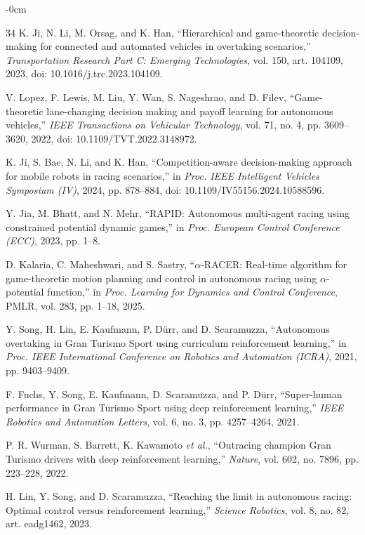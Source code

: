 \documentclass[sensors,article,submit,moreauthors]{Definitions/mdpi}
\begin{document}
\begin{adjustwidth}{-\extralength}{0cm}
\begin{thebibliography}{34}
K. Ji, N. Li, M. Orsag, and K. Han,
``Hierarchical and game-theoretic decision-making for connected and automated
vehicles in overtaking scenarios,'' \emph{Transportation Research Part C:
Emerging Technologies}, vol. 150, art. 104109, 2023,
doi: 10.1016/j.trc.2023.104109.

V. Lopez, F. Lewis, M. Liu, Y. Wan, S. Nageshrao, and D. Filev,
``Game-theoretic lane-changing decision making and payoff learning for
autonomous vehicles,'' \emph{IEEE Transactions on Vehicular Technology},
vol. 71, no. 4, pp. 3609--3620, 2022,
doi: 10.1109/TVT.2022.3148972.

K. Ji, S. Bae, N. Li, and K. Han,
``Competition-aware decision-making approach for mobile robots in racing
scenarios,'' in \emph{Proc. IEEE Intelligent Vehicles Symposium (IV)}, 2024,
pp. 878--884, doi: 10.1109/IV55156.2024.10588596.

Y. Jia, M. Bhatt, and N. Mehr,
``RAPID: Autonomous multi-agent racing using constrained potential dynamic
games,'' in \emph{Proc. European Control Conference (ECC)}, 2023, pp. 1--8.

D. Kalaria, C. Maheshwari, and S. Sastry,
``$\alpha$-RACER: Real-time algorithm for game-theoretic motion planning and
control in autonomous racing using $\alpha$-potential function,'' in
\emph{Proc. Learning for Dynamics and Control Conference}, PMLR, vol. 283,
pp. 1--18, 2025.

Y. Song, H. Lin, E. Kaufmann, P. D\"urr, and D. Scaramuzza,
``Autonomous overtaking in Gran Turismo Sport using curriculum reinforcement
learning,'' in \emph{Proc. IEEE International Conference on Robotics and
Automation (ICRA)}, 2021, pp. 9403--9409.

F. Fuchs, Y. Song, E. Kaufmann, D. Scaramuzza, and P. D\"urr,
``Super-human performance in Gran Turismo Sport using deep reinforcement
learning,'' \emph{IEEE Robotics and Automation Letters}, vol. 6, no. 3,
pp. 4257--4264, 2021.

P. R. Wurman, S. Barrett, K. Kawamoto \emph{et al.},
``Outracing champion Gran Turismo drivers with deep reinforcement learning,''
\emph{Nature}, vol. 602, no. 7896, pp. 223--228, 2022.

H. Lin, Y. Song, and D. Scaramuzza,
``Reaching the limit in autonomous racing: Optimal control versus
reinforcement learning,'' \emph{Science Robotics}, vol. 8, no. 82,
art. eadg1462, 2023.


\end{thebibliography}
\end{adjustwidth}
\end{document}
